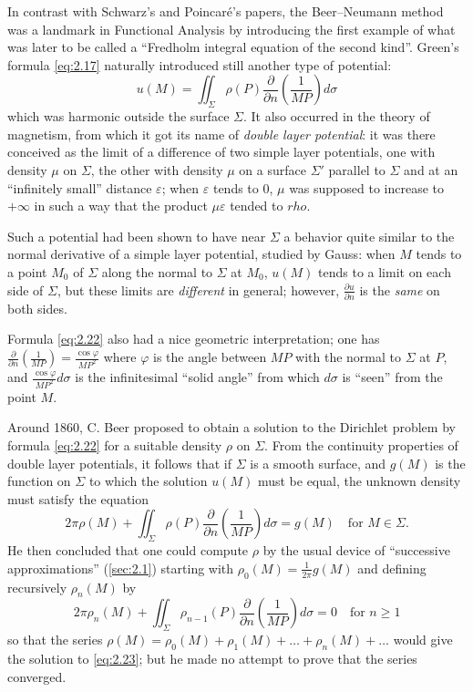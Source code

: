 \documentclass[12pt,a4paper,leqno,twoside]{extbook}
\newcommand{\pder}[2]{\frac{\partial #1}{\partial #2}}
\begin{document}
In contrast with Schwarz's and Poincaré's papers, the Beer--Neumann method was a landmark in Functional Analysis by introducing the first example of what was later to be called a ``Fredholm integral equation of the second kind''. Green's formula \eqref{eq:2.17} naturally introduced still another type of potential:
\begin{equation}
    \label{eq:2.22}
    u(M) = \iint_\Sigma \rho(P) \frac{\partial}{\partial n} \left( \frac{1}{MP} \right) d\sigma
\end{equation}
which was harmonic outside the surface \(\Sigma\). It also occurred in the theory of magnetism, from which it got its name of \emph{double layer potential}: it was there conceived as the limit of a difference of two simple layer potentials, one with density \(\mu\) on \(\Sigma\), the other with density \(\mu\) on a surface \(\Sigma'\) parallel to \(\Sigma\) and at an ``infinitely small'' distance \(\varepsilon\); when \(\varepsilon\) tends to 0, \(\mu\) was supposed to increase to \(+\infty\) in such a way that the product \(\mu \varepsilon\) tended to \(rho\).

Such a potential had been shown to have near \(\Sigma\) a behavior quite similar to the normal derivative of a simple layer potential, studied by Gauss: when \(M\) tends to a point \(M_0\) of \(\Sigma\) along the normal to \(\Sigma\) at \(M_0\), \(u(M)\) tends to a limit on each side of \(\Sigma\), but these limits are \emph{different} in general; however, \(\pder{u}{n}\) is the \emph{same} on both sides.

Formula \eqref{eq:2.22} also had a nice geometric interpretation; one has \(\frac{\partial}{\partial n} \left( \frac{1}{MP} \right) = \frac{\cos \varphi}{MP^2}\) where \(\varphi\) is the angle between \(MP\) with the normal to \(\Sigma\) at \(P\), and \(\frac{\cos \varphi}{MP^2} d\sigma\) is the infinitesimal ``solid angle'' from which \(d\sigma\) is ``seen'' from the point \(M\).

Around 1860, C. Beer proposed to obtain a solution to the Dirichlet problem by formula \eqref{eq:2.22} for a suitable density \(\rho\) on \(\Sigma\). From the continuity properties of double layer potentials, it follows that if \(\Sigma\) is a smooth surface, and \(g(M)\) is the function on \(\Sigma\) to which the solution \(u(M)\) must be equal, the unknown density must satisfy the equation
\begin{equation}
    \label{eq:2.23}
    2\pi \rho(M) + \iint_\Sigma \rho(P) \frac{\partial}{\partial n}\left(\frac{1}{MP}\right) d\sigma = g(M) \quad \text{for } M \in \Sigma.
\end{equation}
He then concluded that one could compute \(\rho\) by the usual device of ``successive approximations'' (\ref{sec:2.1}) starting with \(\rho_0(M) = \frac{1}{2\pi} g(M)\) and defining recursively \(\rho_n(M)\) by
\[
    2\pi \rho_n(M) + \iint_\Sigma \rho_{n-1}(P) \frac{\partial}{\partial n}\left(\frac{1}{MP}\right) d\sigma = 0 \quad \text{for } n \geq 1
\]
so that the series \(\rho(M) = \rho_0(M) + \rho_1(M) + \ldots + \rho_n(M) + \ldots\) would give the solution to \eqref{eq:2.23}; but he made no attempt to prove that the series converged.
\end{document}
